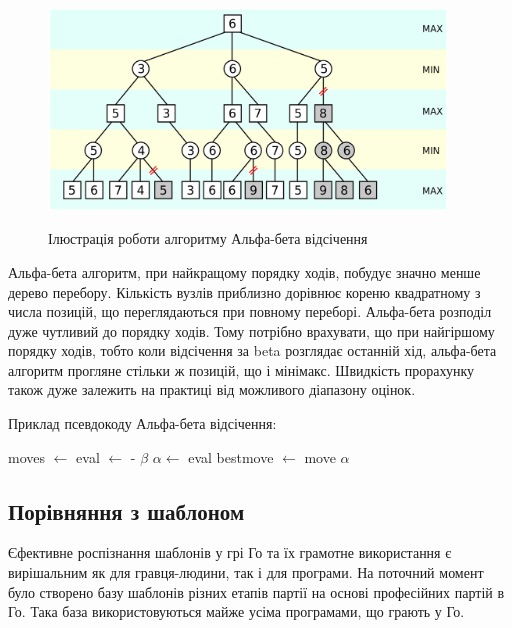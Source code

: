 \begin{figure}[H]
	\centering
	\caption{Ілюстрація роботи алгоритму Альфа-бета відсічення}
	\includegraphics[width=300pt]{AB_pruning}
	\label{fig:AB_pruning}
\end{figure}

Альфа-бета алгоритм, при найкращому порядку ходів, побудує значно менше дерево перебору. Кількість вузлів приблизно дорівнює кореню квадратному з числа позицій, що переглядаються при повному переборі. Альфа-бета розподіл дуже чутливий до порядку ходів. Тому потрібно врахувати, що при найгіршому порядку ходів, тобто коли відсічення за beta розглядає останній хід, альфа-бета алгоритм прогляне стільки ж позицій, що і мінімакс. Швидкість прорахунку також дуже залежить на практиці від можливого діапазону оцінок.

Приклад псевдокоду Альфа-бета відсічення:

\begin{algorithmic}
			\State \Return {}
		\EndIf
		\State moves $\gets$ 
			\State {}
			\State eval $\gets$ -
			\State {}
				\State \Return $\beta$
			\EndIf
				\State $\alpha \gets$ eval
					\State bestmove $\gets$ move
				\EndIf
			\EndIf
		\EndFor
		\State \Return $\alpha$
	\EndFunction
\end{algorithmic}

\subsection{Порівняння з шаблоном}
Єфективне роспізнання шаблонів у грі Го та їх грамотне використання є вирішальним як для гравця-людини, так і для програми. На поточний момент було створено базу шаблонів різних етапів партії на основі професійних партій в Го. Така база використовуються майже усіма програмами, що грають у Го.

